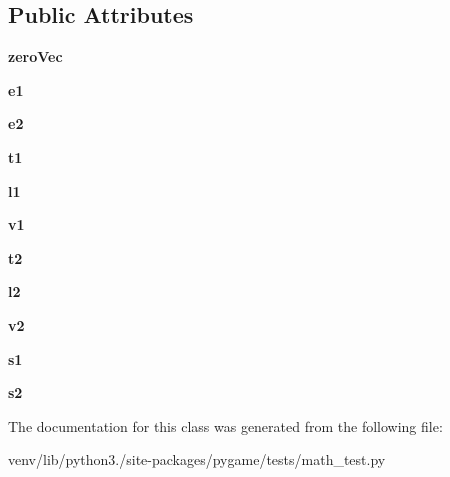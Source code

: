 \subsection*{Public Attributes}
\begin{DoxyCompactItemize}
\item 
\mbox{\label{classpygame_1_1tests_1_1math__test_1_1_vector2_type_test_ad8773044efbe29f6bbcc437680f7629c}} 
{\bfseries zero\+Vec}
\item 
\mbox{\label{classpygame_1_1tests_1_1math__test_1_1_vector2_type_test_aef4c0946c01c0f63541c5c3fe0eb9782}} 
{\bfseries e1}
\item 
\mbox{\label{classpygame_1_1tests_1_1math__test_1_1_vector2_type_test_a5434f6c4a1e72dd9a1804799cf869010}} 
{\bfseries e2}
\item 
\mbox{\label{classpygame_1_1tests_1_1math__test_1_1_vector2_type_test_a47f857caa280b968379f1bf12c585601}} 
{\bfseries t1}
\item 
\mbox{\label{classpygame_1_1tests_1_1math__test_1_1_vector2_type_test_a56e259af70a85ee1adcc92d53028ee8c}} 
{\bfseries l1}
\item 
\mbox{\label{classpygame_1_1tests_1_1math__test_1_1_vector2_type_test_a37be2483f2b688d3a30e318631967f0e}} 
{\bfseries v1}
\item 
\mbox{\label{classpygame_1_1tests_1_1math__test_1_1_vector2_type_test_aab968989d2d17ce55586238b168eb2f1}} 
{\bfseries t2}
\item 
\mbox{\label{classpygame_1_1tests_1_1math__test_1_1_vector2_type_test_a8e740cd175051a9bde10921a5ca8d48f}} 
{\bfseries l2}
\item 
\mbox{\label{classpygame_1_1tests_1_1math__test_1_1_vector2_type_test_a401b7da7bab823d7929c9d4c9411de25}} 
{\bfseries v2}
\item 
\mbox{\label{classpygame_1_1tests_1_1math__test_1_1_vector2_type_test_ac609c03510fb18c8eed114427c970f0d}} 
{\bfseries s1}
\item 
\mbox{\label{classpygame_1_1tests_1_1math__test_1_1_vector2_type_test_a3867cb503efcad26e168529e10803061}} 
{\bfseries s2}
\end{DoxyCompactItemize}


The documentation for this class was generated from the following file\+:\begin{DoxyCompactItemize}
\item 
venv/lib/python3./site-\/packages/pygame/tests/math\+\_\+test.\+py\end{DoxyCompactItemize}
